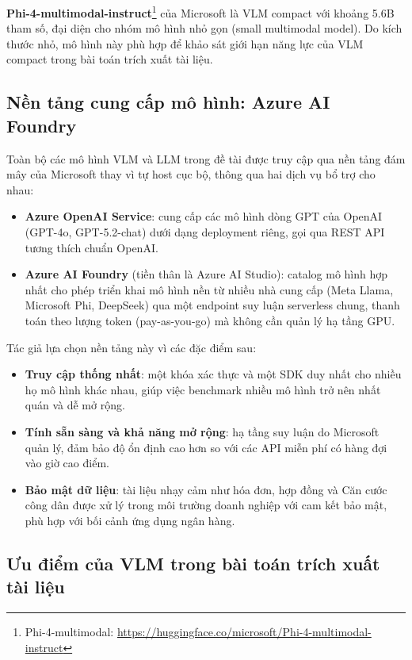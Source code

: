 ﻿\documentclass[12pt]{report}
\begin{document}
\textbf{Phi-4-multimodal-instruct}\footnote{Phi-4-multimodal: \url{https://huggingface.co/microsoft/Phi-4-multimodal-instruct}} của Microsoft là VLM compact với khoảng 5.6B tham số, đại diện cho nhóm mô hình nhỏ gọn (small multimodal model). Do kích thước nhỏ, mô hình này phù hợp để khảo sát giới hạn năng lực của VLM compact trong bài toán trích xuất tài liệu.

\subsection{Nền tảng cung cấp mô hình: Azure AI Foundry}\label{sec:azure_foundry}

Toàn bộ các mô hình VLM và LLM trong đề tài được truy cập qua nền tảng đám mây của Microsoft thay vì tự host cục bộ, thông qua hai dịch vụ bổ trợ cho nhau:

\begin{itemize}
    \item \textbf{Azure OpenAI Service}: cung cấp các mô hình dòng GPT của OpenAI (GPT-4o, GPT-5.2-chat) dưới dạng deployment riêng, gọi qua REST API tương thích chuẩn OpenAI.
    \item \textbf{Azure AI Foundry} (tiền thân là Azure AI Studio): catalog mô hình hợp nhất cho phép triển khai mô hình nền từ nhiều nhà cung cấp (Meta Llama, Microsoft Phi, DeepSeek) qua một endpoint suy luận serverless chung, thanh toán theo lượng token (pay-as-you-go) mà không cần quản lý hạ tầng GPU.
\end{itemize}

Tác giả lựa chọn nền tảng này vì các đặc điểm sau:

\begin{itemize}
    \item \textbf{Truy cập thống nhất}: một khóa xác thực và một SDK duy nhất cho nhiều họ mô hình khác nhau, giúp việc benchmark nhiều mô hình trở nên nhất quán và dễ mở rộng.
    \item \textbf{Tính sẵn sàng và khả năng mở rộng}: hạ tầng suy luận do Microsoft quản lý, đảm bảo độ ổn định cao hơn so với các API miễn phí có hàng đợi vào giờ cao điểm.
    \item \textbf{Bảo mật dữ liệu}: tài liệu nhạy cảm như hóa đơn, hợp đồng và Căn cước công dân được xử lý trong môi trường doanh nghiệp với cam kết bảo mật, phù hợp với bối cảnh ứng dụng ngân hàng.
\end{itemize}

\subsection{Ưu điểm của VLM trong bài toán trích xuất tài liệu}\label{sec:vlm_advantages}
\end{document}
